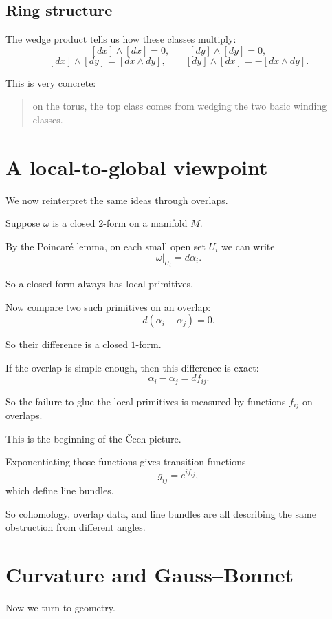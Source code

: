 \documentclass[11pt]{article}
\begin{document}
	\subsection{Ring structure}
	
	The wedge product tells us how these classes multiply:
	\[
	[dx]\wedge[dx]=0,
	\qquad
	[dy]\wedge[dy]=0,
	\]
	\[
	[dx]\wedge[dy]=[dx\wedge dy],
	\qquad
	[dy]\wedge[dx]=-[dx\wedge dy].
	\]
	
	This is very concrete:
	
	\begin{quote}
		on the torus, the top class comes from wedging the two basic winding classes.
	\end{quote}
	
	\section{A local-to-global viewpoint}
	
	We now reinterpret the same ideas through overlaps.
	
	Suppose \(\omega\) is a closed \(2\)-form on a manifold \(M\).
	
	By the Poincar\'e lemma, on each small open set \(U_i\) we can write
	\[
	\omega|_{U_i}=d\alpha_i.
	\]
	
	So a closed form always has local primitives.
	
	Now compare two such primitives on an overlap:
	\[
	d(\alpha_i-\alpha_j)=0.
	\]
	
	So their difference is a closed \(1\)-form.
	
	If the overlap is simple enough, then this difference is exact:
	\[
	\alpha_i-\alpha_j=df_{ij}.
	\]
	
	So the failure to glue the local primitives is measured by functions \(f_{ij}\) on overlaps.
	
	This is the beginning of the \v{C}ech picture.
	
	Exponentiating those functions gives transition functions
	\[
	g_{ij}=e^{if_{ij}},
	\]
	which define line bundles.
	
	So cohomology, overlap data, and line bundles are all describing the same obstruction from different angles.
	
	\section{Curvature and Gauss--Bonnet}
	
	Now we turn to geometry.
	
\end{document}
